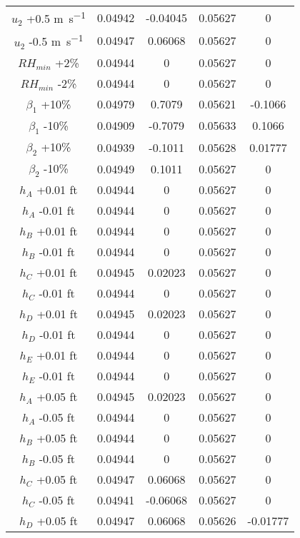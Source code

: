 \begin{linenumbers}
\begin{spacing}{1.0}
\begin{center}
\begin{longtable}{c|cc|cc}
	$u_{2}$ +0.5 \si{\meter\per\second}&	0.04942&	-0.04045&	0.05627&	0\\       
	$u_{2}$ -0.5 \si{\meter\per\second}&	0.04947&	0.06068&	0.05627&	0\\       
	$RH_{min}$ +2\%&						0.04944&	0&	0.05627&	0\\               
	$RH_{min}$ -2\%&						0.04944&	0&	0.05627&	0\\               
	$\beta_{1}$ +10\%&						0.04979&	0.7079&	0.05621&	-0.1066\\     
	$\beta_{1}$ -10\%&						0.04909&	-0.7079&	0.05633&	0.1066\\  
	$\beta_{2}$ +10\%&						0.04939&	-0.1011&	0.05628&	0.01777\\ 
	$\beta_{2}$ -10\%&						0.04949&	0.1011&	0.05627&	0\\           
	$h_{A}$ +0.01 ft&						0.04944&	0&	0.05627&	0\\               
	$h_{A}$ -0.01 ft&						0.04944&	0&	0.05627&	0\\               
	$h_{B}$ +0.01 ft&						0.04944&	0&	0.05627&	0\\               
	$h_{B}$ -0.01 ft&						0.04944&	0&	0.05627&	0\\               
	$h_{C}$ +0.01 ft&						0.04945&	0.02023&	0.05627&	0\\       
	$h_{C}$ -0.01 ft&						0.04944&	0&	0.05627&	0\\               
	$h_{D}$ +0.01 ft&						0.04945&	0.02023&	0.05627&	0\\       
	$h_{D}$ -0.01 ft&						0.04944&	0&	0.05627&	0\\               
	$h_{E}$ +0.01 ft&						0.04944&	0&	0.05627&	0\\               
	$h_{E}$ -0.01 ft&						0.04944&	0&	0.05627&	0\\               
	$h_{A}$ +0.05 ft&						0.04945&	0.02023&	0.05627&	0\\       
	$h_{A}$ -0.05 ft&						0.04944&	0&	0.05627&	0\\               
	$h_{B}$ +0.05 ft&						0.04944&	0&	0.05627&	0\\               
	$h_{B}$ -0.05 ft&						0.04944&	0&	0.05627&	0\\               
	$h_{C}$ +0.05 ft&						0.04947&	0.06068&	0.05627&	0\\       
	$h_{C}$ -0.05 ft&						0.04941&	-0.06068&	0.05627&	0\\       
	$h_{D}$ +0.05 ft&						0.04947&	0.06068&	0.05626&	-0.01777\\

\end{longtable}
\end{center}
\end{spacing}
\end{linenumbers}
